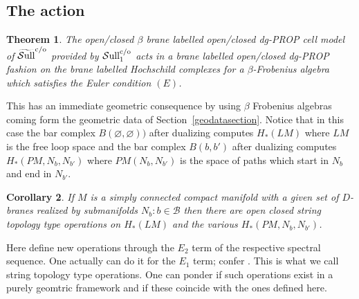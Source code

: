 \documentclass[pdftex]{sigma}
\newtheorem{thm}{Theorem}[section]
\newtheorem{cor}[thm]{Corollary}
\def\calB{{\mathcal B}}
\def\Sull{\rm {\mathcal S}ull^{\rm c/o}}
\def\wSull{\widetilde{\rm {\mathcal S}ull}^{\rm c/o}}
\begin{document}
\subsection{The action}

\begin{thm}
\label{mainthm} The open/closed $\beta$ brane labelled open/closed
 dg-PROP cell model of $\wSull$ provided by $\Sull_1$ acts
in a brane labelled open/closed  dg-PROP fashion on the brane
 labelled Hochschild complexes for a $\beta$-Frobenius algebra which
 satisfies
the Euler condition $(E)$.
\end{thm}


This has an immediate geometric consequence by using $\beta$ Frobenius
algebras coming form the geometric data of Section~\ref{geodatasection}.
Notice that in this case the bar complex
$B(\varnothing,\varnothing))$ after dualizing computes  $H_*(LM)$ where $LM$ is
the free loop space \cite{J} and the bar complex  $B(b,b')$ after dualizing
computes $H_*(PM,N_b,N_{b'})$ where $PM(N_b,N_{b'})$ is the space
of paths which start in $N_b$ and end in $N_{b'}$.

\begin{cor}
If $M$ is a simply connected compact manifold with a given set of
 $D$-branes realized by submanifolds $N_b:b\in\calB$ then there are open
 closed
string topology type operations on $H_*(LM)$ and the various $H_*(PM,N_b,N_{b'})$.
\end{cor}

Here def\/ine new operations through the $E_2$ term of the respective spectral sequence.
One actually can do it for the $E_1$ term; confer \cite{hoch2}.
This is what we call string topology type operations. One can ponder if such
operations exist in a purely geomtric framework and if these coincide with the ones def\/ined here.
\end{document}
